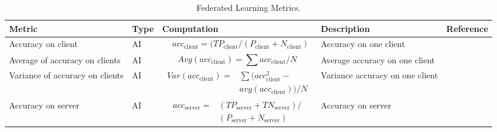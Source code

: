 \begin{table}[h]
\caption{Federated Learning Metrics.} 
\label{tab:fl}
\begin{tabular}{|p{3cm}|l|p{6cm}|p{3cm}|p{1.5cm}|}

\hline
Metric                 & Type      & Computation & Description                                                                & Reference \\ \hline
Accuracy on client
& AI 
& 
\parbox{3cm}{
    \begin{equation} \label{equ:aoc} 
    \begin{split}
& acc_{\text{client}} = (TP_{\text{client}} 
 / (P_{\text{client}} + N_{\text{client}})
    \end{split} 
    \end{equation} 
}
& Accuracy on one client 
& \cite{DBLP:conf/iclr/LiSBS20}       
\\ \hline

Average of accuracy on clients
& AI
&
\parbox{3cm}{
    \begin{equation} \label{equ:aoaoc} 
    Avg(acc_{\text{client}}) = \sum acc_{\text{client}} / N
    \end{equation}
}
& Average accuracy on one client 
& \cite{DBLP:conf/iclr/LiSBS20}       
\\ \hline

Variance of accuracy on clients
& AI
&
\parbox{3cm}{
    \begin{equation} \label{equ:voaoc} 
    \begin{split}
    Var(acc_{\text{client}}) =
    & \sum (acc_{\text{client}}^2 - \\ 
    & avg(acc_{\text{client}})) / N
    \end{split}
    \end{equation}
}
& Variance accuracy on one client 
& \cite{DBLP:conf/iclr/LiSBS20}       
\\ \hline

Accuracy on server
& AI
&
\parbox{3cm}{
    \begin{equation} \label{equ:aos} 
    \begin{split}
acc_{\text{server}} = 
& (TP_{\text{server}} + TN_{\text{server}}) / \\
& (P_{\text{server}} + N_{\text{server}} )
    \end{split}
    \end{equation}
}
& 
Accuracy on server
& \cite{DBLP:conf/aistats/McMahanMRHA17}
\\ \hline


\end{tabular}
\end{table}
